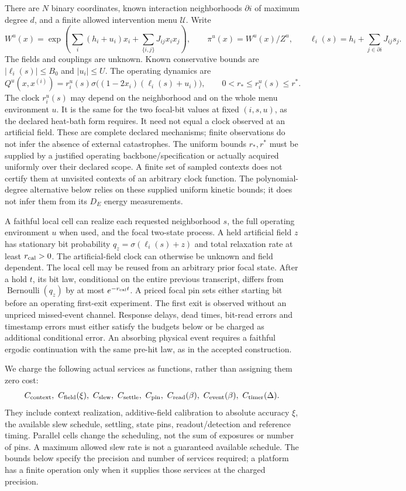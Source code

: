 \documentclass[11pt]{article}
\newcommand{\sig}{\sigma}
\begin{document}
There are $N$ binary coordinates, known interaction neighborhoods
$\partial i$ of maximum degree $d$, and a finite allowed intervention menu
$\mathcal U$. Write
\[
 W^u(x)=\exp\!\left(\sum_i(h_i+u_i)x_i+
                    \sum_{\{i,j\}}J_{ij}x_ix_j\right),\qquad
 \pi^u(x)=W^u(x)/Z^u,\qquad
 \ell_i(s)=h_i+\sum_{j\in\partial i}J_{ij}s_j .
\]
The fields and couplings are unknown. Known conservative bounds are
$|\ell_i(s)|\le B_0$ and $|u_i|\le U$. The operating dynamics are
\begin{equation}\label{eq:Q}
 Q^u(x,x^{(i)})=r_i^u(s)\sig\!\big((1-2x_i)(\ell_i(s)+u_i)\big),
 \qquad 0<r_*\le r_i^u(s)\le r^* .
\end{equation}
The clock $r_i^u(s)$ may depend on the neighborhood and on the whole menu
environment $u$. It is the same for the two focal-bit values at fixed
$(i,s,u)$, as the declared heat-bath form requires. It need not equal a clock
observed at an artificial field. These are complete declared mechanisms;
finite observations do not infer the absence of external catastrophes.
The uniform bounds $r_*,r^*$ must be supplied by a justified operating
backbone/specification or actually acquired uniformly over their declared
scope. A finite set of sampled contexts does not certify them at
unvisited contexts of an arbitrary clock function. The polynomial-degree
alternative below relies on these supplied uniform kinetic bounds; it
does not infer them from its $D_E$ energy measurements.

A faithful local cell can realize each requested neighborhood $s$, the full
operating environment $u$ when used, and the focal two-state process. A held
artificial field $z$ has stationary bit probability
$q_z=\sig(\ell_i(s)+z)$ and total relaxation rate at least $r_{\rm cal}>0$.
The artificial-field clock can otherwise be unknown and field dependent.
The local cell may be reused from an arbitrary prior focal state. After a
hold $t$, its bit law, conditional on the entire previous transcript, differs
from $\operatorname{Bernoulli}(q_z)$ by at most $e^{-r_{\rm cal}t}$.
A priced focal pin sets either starting bit before an operating first-exit
experiment. The first exit is observed without an unpriced missed-event
channel. Response delays, dead times, bit-read errors and timestamp errors
must either satisfy the budgets below or be charged as additional
conditional error. An absorbing physical event requires a faithful ergodic
continuation with the same pre-hit law, as in the accepted construction.

We charge the following actual services as functions, rather than assigning
them zero cost:
\[
 C_{\rm context},\ C_{\rm field}(\xi),\ C_{\rm slew},\
 C_{\rm settle},\ C_{\rm pin},\ C_{\rm read}(\beta),\
 C_{\rm event}(\beta),\ C_{\rm timer}(\Delta).
\]
They include context realization, additive-field calibration to absolute
accuracy $\xi$, the available slew schedule, settling, state pins,
readout/detection and reference timing. Parallel cells change the scheduling,
not the sum of exposures or number of pins. A maximum allowed slew rate is
not a guaranteed available schedule. The bounds below specify the precision
and number of services required; a platform has a finite operation only when
it supplies those services at the charged precision.
\end{document}
